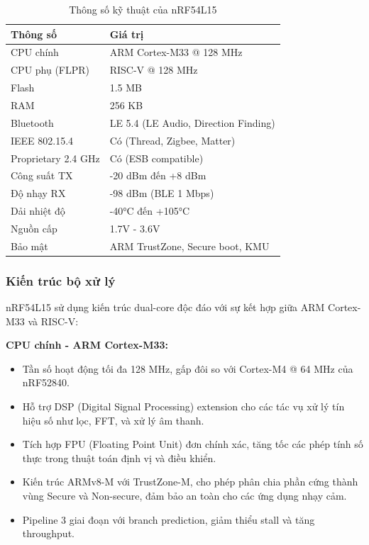 \begin{table}[h!]
\centering
\caption{Thông số kỹ thuật của nRF54L15}
\label{tab:nrf54l15_specs}
\begin{tabular}{|l|l|}
\hline
\textbf{Thông số} & \textbf{Giá trị} \\
\hline
CPU chính & ARM Cortex-M33 @ 128 MHz \\
\hline
CPU phụ (FLPR) & RISC-V @ 128 MHz \\
\hline
Flash & 1.5 MB \\
\hline
RAM & 256 KB \\
\hline
Bluetooth & LE 5.4 (LE Audio, Direction Finding) \\
\hline
IEEE 802.15.4 & Có (Thread, Zigbee, Matter) \\
\hline
Proprietary 2.4 GHz & Có (ESB compatible) \\
\hline
Công suất TX & -20 dBm đến +8 dBm \\
\hline
Độ nhạy RX & -98 dBm (BLE 1 Mbps) \\
\hline
Dải nhiệt độ & -40°C đến +105°C \\
\hline
Nguồn cấp & 1.7V - 3.6V \\
\hline
Bảo mật & ARM TrustZone, Secure boot, KMU \\
\hline
\end{tabular}
\end{table}

\subsubsection{Kiến trúc bộ xử lý}

nRF54L15 sử dụng kiến trúc dual-core độc đáo với sự kết hợp giữa ARM Cortex-M33 và RISC-V:

\textbf{CPU chính - ARM Cortex-M33:}
\begin{itemize}
    \item Tần số hoạt động tối đa 128 MHz, gấp đôi so với Cortex-M4 @ 64 MHz của nRF52840.
    \item Hỗ trợ DSP (Digital Signal Processing) extension cho các tác vụ xử lý tín hiệu số như lọc, FFT, và xử lý âm thanh.
    \item Tích hợp FPU (Floating Point Unit) đơn chính xác, tăng tốc các phép tính số thực trong thuật toán định vị và điều khiển.
    \item Kiến trúc ARMv8-M với TrustZone-M, cho phép phân chia phần cứng thành vùng Secure và Non-secure, đảm bảo an toàn cho các ứng dụng nhạy cảm.
    \item Pipeline 3 giai đoạn với branch prediction, giảm thiểu stall và tăng throughput.
\end{itemize}

